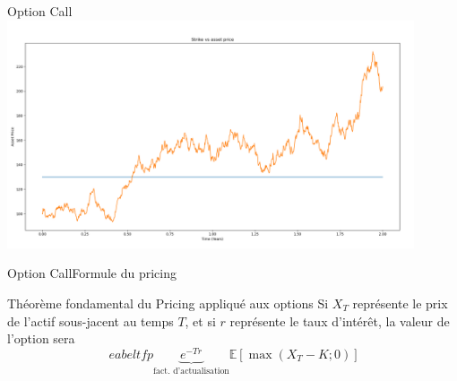 \documentclass{beamer}
\newcommand{\1}{\mathmybb{1}}
\begin{document}
\begin{frame}{Option Call}
  \includegraphics[width=12cm]{imgs/strike.png}
\end{frame}
\begin{frame}{Option Call}{Formule du pricing}
\begin{block}{Théorème fondamental du Pricing appliqué aux options}
    Si $X_T$  représente le prix de l'actif sous-jacent au temps $T$, et si $r$ représente le taux d'intérêt, la valeur de l'option sera
    \begin{equation} \
eabel{tfp}
      \underbrace{e^{-Tr}}_{\text{fact. d'actualisation}}\mathbb{E}\left[ \max \left(X_{T} - K; 0 \right) \right]
    \end{equation}
  \end{block}
\end{frame}
\end{document}
